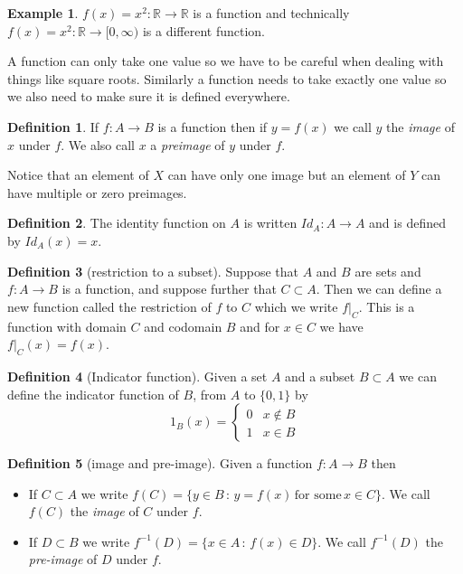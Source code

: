 \documentclass[
]{book}
\theoremstyle{definition}
\newtheorem{definition}{Definition}[chapter]
\theoremstyle{definition}
\newtheorem{example}{Example}[chapter]
\theoremstyle{definition}
\theoremstyle{definition}
\theoremstyle{remark}
\begin{document}
\begin{example}
\(f(x) = x^2 : \mathbb{R} \rightarrow \mathbb{R}\) is a function and technically \(f(x) = x^2: \mathbb{R} \rightarrow [0,\infty)\) is a different function.
\end{example}

A function can only take one value so we have to be careful when dealing with things like square roots. Similarly a function needs to take exactly one value so we also need to make sure it is defined everywhere.

\begin{definition}
If \(f: A \rightarrow B\) is a function then if \(y = f(x)\) we call \(y\) the \emph{image} of \(x\) under \(f\). We also call \(x\) a \emph{preimage} of \(y\) under \(f\).

Notice that an element of \(X\) can have only one image but an element of \(Y\) can have multiple or zero preimages.
\end{definition}

\begin{definition}
The identity function on \(A\) is written \(Id_A : A \rightarrow A\) and is defined by \(Id_A(x)=x\).
\end{definition}

\begin{definition}[restriction to a subset]
Suppose that \(A\) and \(B\) are sets and \(f : A \rightarrow B\) is a function, and suppose further that \(C \subset A\). Then we can define a new function called the restriction of \(f\) to \(C\) which we write \(f|_C\). This is a function with domain \(C\) and codomain \(B\) and for \(x \in C\) we have \(f|_C(x) = f(x)\).
\end{definition}

\begin{definition}[Indicator function]
Given a set \(A\) and a subset \(B \subset A\) we can define the indicator function of \(B\), from \(A\) to \(\{0,1\}\) by
\[ 1_B(x) = \left\{\begin{array}{cc} 0 & x \not\in B\\ 1 & x \in B \end{array} \right. \]
\end{definition}

\begin{definition}[image and pre-image]

Given a function \(f:A \rightarrow B\) then

\begin{itemize}
\item
  If \(C \subset A\) we write \(f(C) = \{y \in B \,:\, y = f(x) \, \mbox{for some} \, x \in C\}\). We call \(f(C)\) the \emph{image} of \(C\) under \(f\).
\item
  If \(D \subset B\) we write \(f^{-1}(D) = \{ x \in A \,:\, f(x) \in D\}\). We call \(f^{-1}(D)\) the \emph{pre-image} of \(D\) under \(f\).
\end{itemize}

\end{definition}
\end{document}
